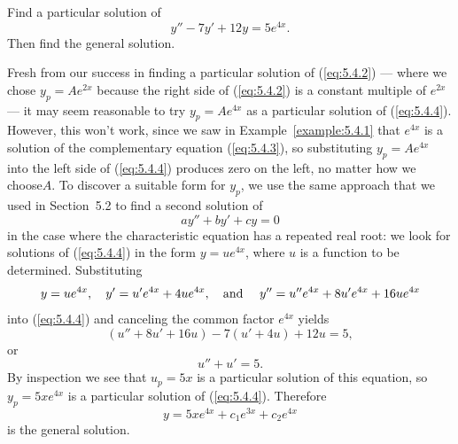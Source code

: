 \setcounter{example}{1}
\setcounter{equation}{3}
\begin{example}
  \label{example:5.4.2} \rm Find a particular solution of
  \begin{equation}
    \label{eq:5.4.4}y''-7y'+12y=5e^{4x}.
  \end{equation}
  Then find the general solution.
\end{example}
\setcounter{equation}{4}
\begin{examplesolution}
\solution Fresh from our success in finding a particular solution of (\ref{eq:5.4.2}) --- where we
chose $y_{p}=Ae^{2x}$ because the right side of (\ref{eq:5.4.2}) is a constant multiple of $e^{2x}$
--- it may seem reasonable to try $y_{p}=Ae^{4x}$ as a particular solution of (\ref{eq:5.4.4}).
However, this won't work, since we saw in Example~\ref{example:5.4.1} that $e^{4x}$ is a solution of
the complementary equation (\ref{eq:5.4.3}), so substituting $y_{p}=Ae^{4x}$ into the left side of
(\ref{eq:5.4.4}) produces zero on the left, no matter how we choose$A$. To discover a suitable form
for $y_{p}$, we use the same approach that we used in Section~5.2 to find a second solution of
\[
  ay''+by'+cy=0
\]
in the case where the characteristic equation has a repeated real root: we look for solutions of
(\ref{eq:5.4.4}) in the form $y=ue^{4x}$, where $u$ is a function to be determined. Substituting
\begin{equation}
  \label{eq:5.4.5}y=ue^{4x},\quad y'=u'e^{4x}+4ue^{4x},\mbox{\quad and \quad}y''=u''e^{4x}+8u'e^{4x}+16ue^{4x}
\end{equation}
into (\ref{eq:5.4.4}) and canceling the common factor $e^{4x}$ yields
\[
  (u''+8u'+16u)-7(u'+4u)+12u=5,
\]
or
\[
  u''+u'=5.
\]
By inspection we see that $u_{p}=5x$ is a particular solution of this equation, so $y_{p}=5xe^{4x}$
is a particular solution of (\ref{eq:5.4.4}). Therefore
\[
  y=5xe^{4x}+c_{1}e^{3x}+c_{2}e^{4x}
\]
is the general solution.
\end{examplesolution}

